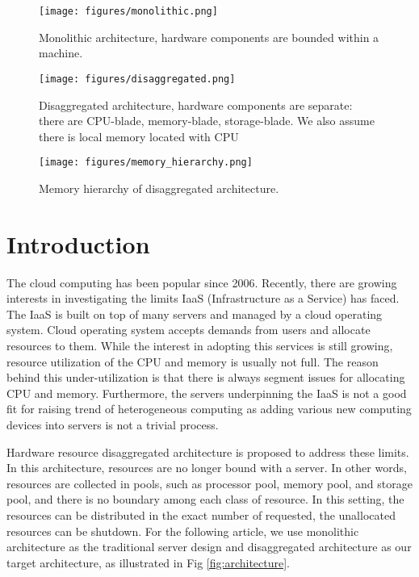 \documentclass[twocolumn]{article}
\begin{document}
\begin{figure*}[h!]
     \centering
     \captionsetup[subfigure]{position=b}
     \begin{subfigure}[b]{0.28\textwidth}
         \centering
         \texttt{[image: figures/monolithic.png]}
         \caption{Monolithic architecture, hardware components are bounded within a machine.}
         \label{fig:monolithic architecture}
     \end{subfigure}
     \hfill
     \begin{subfigure}[b]{0.68\textwidth}
         \centering
         \texttt{[image: figures/disaggregated.png]}
         \caption{Disaggregated architecture, hardware components are separate: there are CPU-blade, memory-blade, storage-blade. We also assume there is local memory located with CPU}
         \label{fig:disaggregated architecture}
     \end{subfigure}
     \caption{Monolithic architecture and disaggregated architecture.}
     \label{fig:architecture}
\end{figure*}

\begin{figure}[h!]
     \centering
     \texttt{[image: figures/memory\_hierarchy.png]}
     \caption{Memory hierarchy of disaggregated architecture.}
     \label{fig:memory hierarchy}
\end{figure}


\section{Introduction}

The cloud computing has been popular since 2006. Recently, there are growing interests in investigating the limits IaaS (Infrastructure as a Service) has faced. The IaaS is built on top of many servers and managed by a cloud operating system.  Cloud operating system accepts demands from users and allocate resources to them. While the interest in adopting this services is still growing, resource utilization of the CPU and memory is usually not full. The reason behind this under-utilization is that there is always segment issues for allocating CPU and memory. Furthermore, the servers underpinning the IaaS is not a good fit for raising trend of heterogeneous computing as adding various new computing devices into servers is not a trivial process.

Hardware resource disaggregated architecture is proposed to address these limits. In this architecture, resources are no longer bound with a server. In other words, resources are collected in pools, such as processor pool, memory pool, and storage pool, and there is no boundary among each class of resource. In this setting, the resources can be distributed in the exact number of requested, the unallocated resources can be shutdown. For the following article, we use monolithic architecture as the traditional server design and disaggregated architecture as our target architecture, as illustrated in Fig \ref{fig:architecture}.
\end{document}
